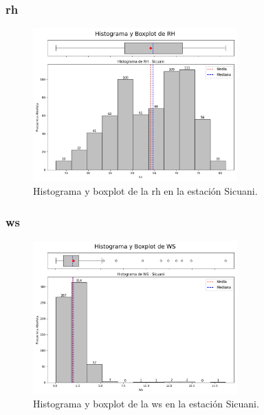 \subsubsection*{\gls{rh} }
\begin{figure}[htbp]
\centering
\includegraphics[width=0.7\textwidth]{resultados/por_estacion_meteorologica/Sicuani/RH_histograma.png}
\caption{Histograma y boxplot de la \gls{rh}  en la estación Sicuani.}
\label{fig:sicuani_RH}
\end{figure}

\subsubsection*{\gls{ws} }
\begin{figure}[htbp]
\centering
\includegraphics[width=0.7\textwidth]{resultados/por_estacion_meteorologica/Sicuani/WS_histograma.png}
\caption{Histograma y boxplot de la \gls{ws}  en la estación Sicuani.}
\label{fig:sicuani_WS}
\end{figure}

